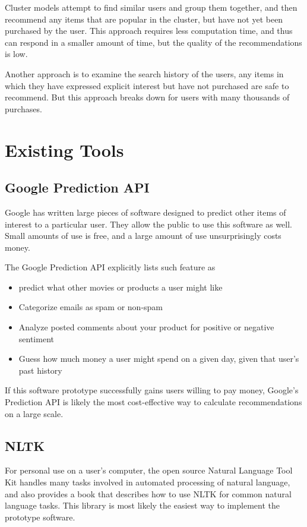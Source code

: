 \documentclass[12pt]{article}
\begin{document}
Cluster models attempt to find similar users and group them together, and then recommend any items that are
popular in the cluster, but have not yet been purchased by the user. This approach requires less computation
time, and thus can respond in a smaller amount of time, but the quality of the recommendations is low.

Another approach is to examine the search history of the users, any items in which they have expressed
explicit interest but have not purchased are safe to recommend. But this approach breaks down for users with
many thousands of purchases.

\section{Existing Tools}
\subsection{Google Prediction API}
Google has written large pieces of software designed to predict other items of interest to a particular
user. They allow the public to use this software as well. Small amounts of use is free, and a large amount of
use unsurprisingly costs money. \citep{GooglePrediction:2013:Online}

The Google Prediction API explicitly lists such feature as
\begin{itemize}
\item predict what other movies or products a user might like
\item Categorize emails as spam or non-spam
\item Analyze posted comments about your product for positive or negative sentiment
\item Guess how much money a user might spend on a given day, given that user's past history
\end{itemize}

If this software prototype successfully gains users willing to pay money, Google's Prediction API is likely
the most cost-effective way to calculate recommendations on a large scale.
\subsection{NLTK}
For personal use on a user's computer, the open source Natural Language Tool Kit handles many tasks involved
in automated processing of natural language, and also provides a book that describes how to use NLTK for
common natural language tasks. This library is most likely the easiest way to implement the prototype
software. \citep{NLTK:2013:Online}
\end{document}
